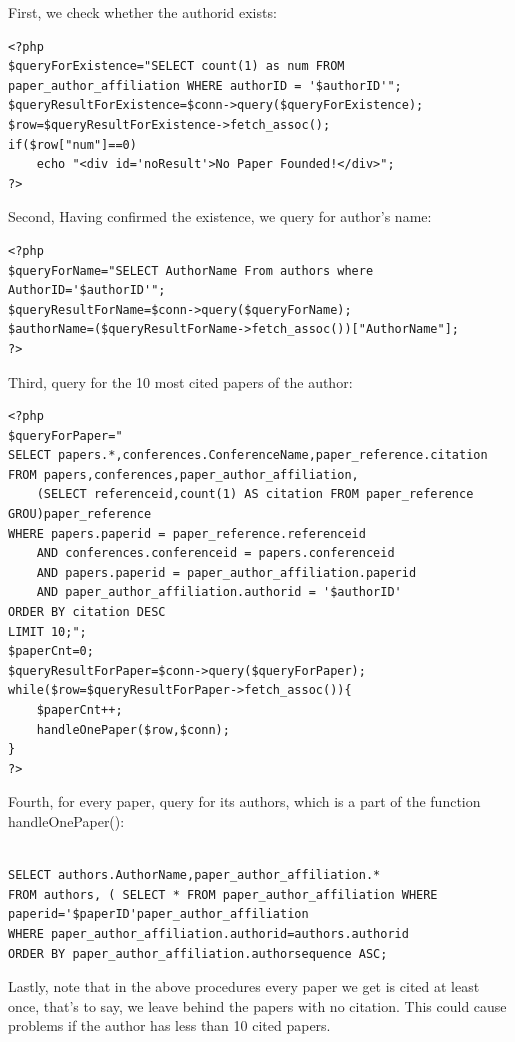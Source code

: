 \documentclass[a4paper]{article}
\begin{document}
First, we check whether the authorid exists:
                \begin{verbatim}
<?php
$queryForExistence="SELECT count(1) as num FROM paper_author_affiliation WHERE authorID = '$authorID'";
$queryResultForExistence=$conn->query($queryForExistence);
$row=$queryResultForExistence->fetch_assoc();
if($row["num"]==0)
    echo "<div id='noResult'>No Paper Founded!</div>";
?>
                \end{verbatim}
Second, Having confirmed the existence, we query for author's name:
                \begin{verbatim}
<?php
$queryForName="SELECT AuthorName From authors where AuthorID='$authorID'";
$queryResultForName=$conn->query($queryForName);
$authorName=($queryResultForName->fetch_assoc())["AuthorName"];
?>
                \end{verbatim}
Third, query for the 10 most cited papers of the author:
                    \begin{verbatim}
<?php
$queryForPaper="
SELECT papers.*,conferences.ConferenceName,paper_reference.citation
FROM papers,conferences,paper_author_affiliation,
    (SELECT referenceid,count(1) AS citation FROM paper_reference GROU)paper_reference
WHERE papers.paperid = paper_reference.referenceid
    AND conferences.conferenceid = papers.conferenceid
    AND papers.paperid = paper_author_affiliation.paperid
    AND paper_author_affiliation.authorid = '$authorID'
ORDER BY citation DESC
LIMIT 10;";
$paperCnt=0;
$queryResultForPaper=$conn->query($queryForPaper);
while($row=$queryResultForPaper->fetch_assoc()){
    $paperCnt++;
    handleOnePaper($row,$conn);
}
?>                   \end{verbatim}
Fourth, for every paper, query for its authors, which is a part of the function handleOnePaper():
                    \begin{verbatim}

SELECT authors.AuthorName,paper_author_affiliation.*
FROM authors, ( SELECT * FROM paper_author_affiliation WHERE paperid='$paperID'paper_author_affiliation
WHERE paper_author_affiliation.authorid=authors.authorid
ORDER BY paper_author_affiliation.authorsequence ASC;
                    \end{verbatim}
Lastly, note that in the above procedures every paper we get is cited at least once, that's to say, we leave behind the papers with no citation. This could cause problems if the author has less than 10 cited papers.
\end{document}
